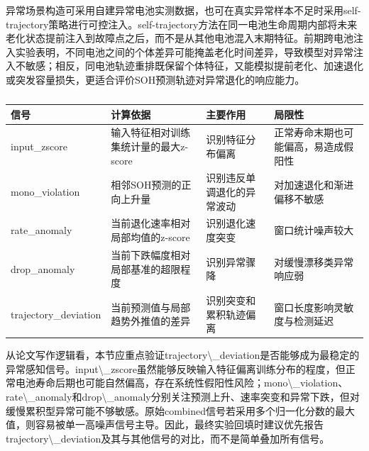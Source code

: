 \documentclass[12pt, a4paper]{ctexart}
\begin{document}
异常场景构造可采用自建异常电池实测数据，也可在真实异常样本不足时采用self-trajectory策略进行可控注入。self-trajectory方法在同一电池生命周期内部将未来老化状态提前注入到故障点之后，而不是从其他电池混入末期特征。前期跨电池注入实验表明，不同电池之间的个体差异可能掩盖老化时间差异，导致模型对异常注入不敏感；相反，同电池轨迹重排既保留个体特征，又能模拟提前老化、加速退化或突发容量损失，更适合评价SOH预测轨迹对异常退化的响应能力。



\begin{table}[H]
  \centering
  \begin{tabular}{llll}
  \toprule
  信号 & 计算依据 & 主要作用 & 局限性 \\
  \midrule
  input\_zscore & 输入特征相对训练集统计量的最大z-score & 识别特征分布偏离 & 正常寿命末期也可能偏高，易造成假阳性 \\
  mono\_violation & 相邻SOH预测的正向上升量 & 识别违反单调退化的异常波动 & 对加速退化和渐进偏移不敏感 \\
  rate\_anomaly & 当前退化速率相对局部均值的z-score & 识别退化速度突变 & 窗口统计噪声较大 \\
  drop\_anomaly & 当前下跌幅度相对局部基准的超限程度 & 识别异常骤降 & 对缓慢漂移类异常响应弱 \\
  trajectory\_deviation & 当前预测值与局部趋势外推值的差异 & 识别突变和累积轨迹偏离 & 窗口长度影响灵敏度与检测延迟 \\
  \bottomrule
  \end{tabular}
  \caption{}
  \label{tab:}
\end{table}


从论文写作逻辑看，本节应重点验证trajectory\textbackslash{}\_deviation是否能够成为最稳定的异常感知信号。input\textbackslash{}\_zscore虽然能够反映输入特征偏离训练分布的程度，但正常电池寿命后期也可能自然偏高，存在系统性假阳性风险；mono\textbackslash{}\_violation、rate\textbackslash{}\_anomaly和drop\textbackslash{}\_anomaly分别关注预测上升、速率突变和异常下跌，但对缓慢累积型异常可能不够敏感。原始combined信号若采用多个归一化分数的最大值，则容易被单一高噪声信号主导。因此，最终实验回填时建议优先报告trajectory\textbackslash{}\_deviation及其与其他信号的对比，而不是简单叠加所有信号。


\end{document}
